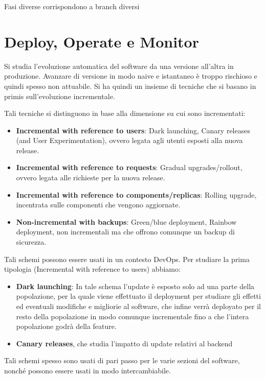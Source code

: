 Fasi diverse corrispondono a branch diversi
\section{Deploy, Operate e Monitor}
Si studia l'evoluzione automatica del software da una versione all'altra in
produzione. Avanzare di versione in modo naive e istantaneo è troppo rischioso e
quindi spesso non attuabile. Si ha quindi un insieme di tecniche che si basano
in primis sull'evoluzione incrementale.

Tali tecniche si distinguono in base alla dimensione su cui sono incrementati:
\begin{itemize}
    \item \textbf{Incremental with reference to users}: Dark launching, Canary
          releases (and User Experimentation), ovvero legata agli utenti esposti alla nuova release.
    \item \textbf{Incremental with reference to requests}: Gradual upgrades/rollout,
          ovvero legata alle richieste per la nuova release.
    \item \textbf{Incremental with reference to components/replicas}: Rolling upgrade,
          incentrata sulle componenti che vengono aggiornate.
    \item \textbf{Non-incremental with backups}: Green/blue deployment,
          Rainbow deployment, non incrementali ma che offrono comunque un backup di sicurezza.
\end{itemize}

Tali schemi possono essere usati in un contesto DevOps. Per studiare la prima
tipologia (Incremental with reference to users) abbiamo:
\begin{itemize}
    \item \textbf{Dark launching}: In tale schema l'update è esposto solo ad una
          parte della popolazione, per la quale viene effettuato il deployment per
          studiare gli effetti ed eventuali modifiche e migliorie al software, che infine
          verrà deployato per il resto della popolazione in modo comunque incrementale
          fino a che l'intera popolazione godrà della feature.
    \item \textbf{Canary releases}, che studia l'impatto di update relativi al
          backend
\end{itemize}

Tali schemi spesso sono usati di pari passo per le varie sezioni del software,
nonché possono essere usati in modo intercambiabile.

